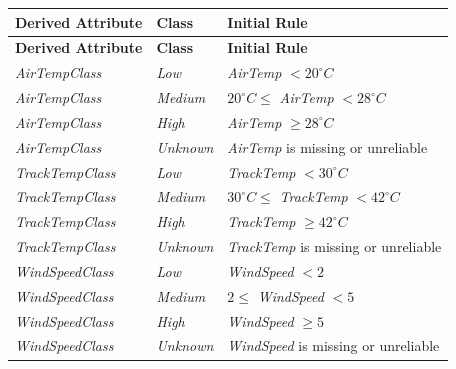 \documentclass[a4paper,11pt]{article}
\begin{document}
		
	\begin{longtable}{|p{4cm}|p{4cm}|p{6cm}|}
		\hline
		\textbf{Derived Attribute} & \textbf{Class} & \textbf{Initial Rule} \\
		\hline
		\endfirsthead
		
		\hline
		\textbf{Derived Attribute} & \textbf{Class} & \textbf{Initial Rule} \\
		\hline
		\endhead
		
		\textit{AirTempClass}
		& \textit{Low}
		& \textit{AirTemp} $< 20^\circ C$ \\
		\hline
		
		\textit{AirTempClass}
		& \textit{Medium}
		& $20^\circ C \leq$ \textit{AirTemp} $< 28^\circ C$ \\
		\hline
		
		\textit{AirTempClass}
		& \textit{High}
		& \textit{AirTemp} $\geq 28^\circ C$ \\
		\hline
		
		\textit{AirTempClass}
		& \textit{Unknown}
		& \textit{AirTemp} is missing or unreliable \\
		\hline
		
		\textit{TrackTempClass}
		& \textit{Low}
		& \textit{TrackTemp} $< 30^\circ C$ \\
		\hline
		
		\textit{TrackTempClass}
		& \textit{Medium}
		& $30^\circ C \leq$ \textit{TrackTemp} $< 42^\circ C$ \\
		\hline
		
		\textit{TrackTempClass}
		& \textit{High}
		& \textit{TrackTemp} $\geq 42^\circ C$ \\
		\hline
		
		\textit{TrackTempClass}
		& \textit{Unknown}
		& \textit{TrackTemp} is missing or unreliable \\
		\hline
		
		\textit{WindSpeedClass}
		& \textit{Low}
		& \textit{WindSpeed} $< 2$ \\
		\hline
		
		\textit{WindSpeedClass}
		& \textit{Medium}
		& $2 \leq$ \textit{WindSpeed} $< 5$ \\
		\hline
		
		\textit{WindSpeedClass}
		& \textit{High}
		& \textit{WindSpeed} $\geq 5$ \\
		\hline
		
		\textit{WindSpeedClass}
		& \textit{Unknown}
		& \textit{WindSpeed} is missing or unreliable \\
		\hline
		
	\end{longtable}
		
\end{document}
